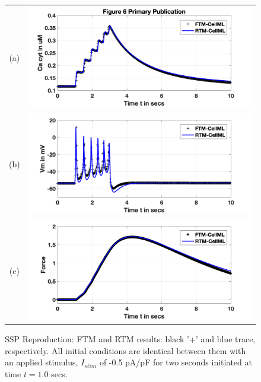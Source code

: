 \documentclass[fleqn,10pt]{physiome}
\begin{document}
\begin{figure}[ht]\centering
\begin{tabular}{c c}
\centering
(a) & \includegraphics[scale=0.35]{./pics/fig6_cacyt}  \\
(b) & \includegraphics[scale=0.35]{./pics/fig6_vm}  \\
(c) & \includegraphics[scale=0.35]{./pics/fig6_force}  \\
\end{tabular}
\caption{SSP Reproduction: FTM and RTM results: black '+' and blue trace, respectively. All initial conditions are identical between them with an applied stimulus, $I_{stim}$ of -0.5 pA/pF for two seconds initiated at time $t=1.0$ secs.}
\label{fig:ssp}
\end{figure}
\end{document}
